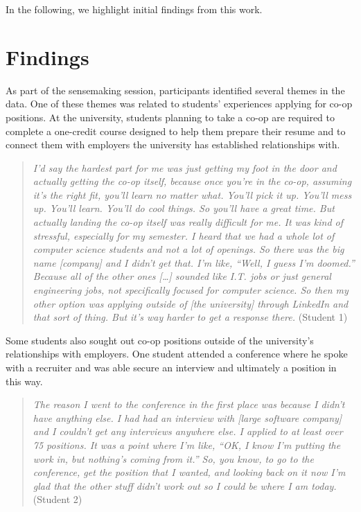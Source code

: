 \documentclass{article}
\begin{document}
In the following, we highlight initial findings from this work.

\section{Findings}
As part of the sensemaking session, participants identified several themes in the data. One of these themes was related to students’ experiences applying for co-op positions. At the university, students planning to take a co-op are required to complete a one-credit course designed to help them prepare their resume and to connect them with employers the university has established relationships with.


\begin{quote}
    \textit{I'd say the hardest part for me was just getting my foot in the door and actually getting the co-op itself, because once you're in the co-op, assuming it's the right fit, you'll learn no matter what. You'll pick it up. You'll mess up. You'll learn. You'll do cool things. So you'll have a great time. But actually landing the co-op itself was really difficult for me. It was kind of stressful, especially for my semester. I heard that we had a whole lot of computer science students and not a lot of openings. So there was the big name [company] and I didn't get that. I'm like, “Well, I guess I'm doomed.” Because all of the other ones […] sounded like I.T. jobs or just general engineering jobs, not specifically focused for computer science. So then my other option was applying outside of [the university] through LinkedIn and that sort of thing. But it's way harder to get a response there.} (Student 1)
\end{quote}

Some students also sought out co-op positions outside of the university’s relationships with employers. One student attended a conference where he spoke with a recruiter and was able secure an interview and ultimately a position in this way.

\begin{quote}
    \textit{The reason I went to the conference in the first place was because I didn’t have anything else. I had had an interview with [large software company] and I couldn't get any interviews anywhere else. I applied to at least over 75 positions. It was a point where I'm like, “OK, I know I'm putting the work in, but nothing's coming from it.” So, you know, to go to the conference, get the position that I wanted, and looking back on it now I'm glad that the other stuff didn't work out so I could be where I am today.} (Student 2)
\end{quote}
\end{document}
